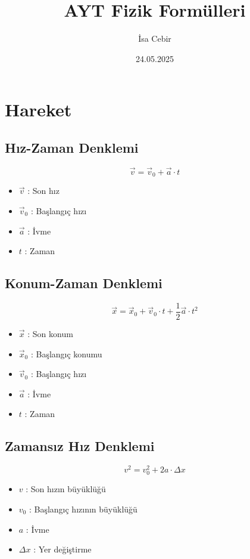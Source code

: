\documentclass[a4paper, 11pt, titlepage]{article}
\title{AYT Fizik Formülleri}
\author{İsa Cebir}
\date{24.05.2025}
\begin{document}
\pagestyle{fancy}
\maketitle
\thispagestyle{empty}
\fancyhf{} 
\fancyfoot[R]{\thepage}
\renewcommand{\headrulewidth}{0.2pt}
\renewcommand{\footrulewidth}{0.2pt}

\twocolumn

\tableofcontents
\newpage
\twocolumn

\section{Hareket}

\subsection{Hız-Zaman Denklemi}
\[
\vec{v} = \vec{v}_0 + \vec{a} \cdot t
\]
\begin{itemize}
  \item $\vec{v}$ : Son hız
  \item $\vec{v}_0$ : Başlangıç hızı
  \item $\vec{a}$ : İvme
  \item $t$ : Zaman
\end{itemize}

\subsection{Konum-Zaman Denklemi}
\[
\vec{x} = \vec{x}_0 + \vec{v}_0 \cdot t + \frac{1}{2} \vec{a} \cdot t^2
\]
\begin{itemize}
  \item $\vec{x}$ : Son konum
  \item $\vec{x}_0$ : Başlangıç konumu
  \item $\vec{v}_0$ : Başlangıç hızı
  \item $\vec{a}$ : İvme
  \item $t$ : Zaman
\end{itemize}


\subsection{Zamansız Hız Denklemi}
\[
v^2 = v_0^2 + 2a \cdot \Delta x
\]
\begin{itemize}
  \item $v$ : Son hızın büyüklüğü
  \item $v_0$ : Başlangıç hızının büyüklüğü
  \item $a$ : İvme
  \item $\Delta x$ : Yer değiştirme
\end{itemize}
\end{document}
